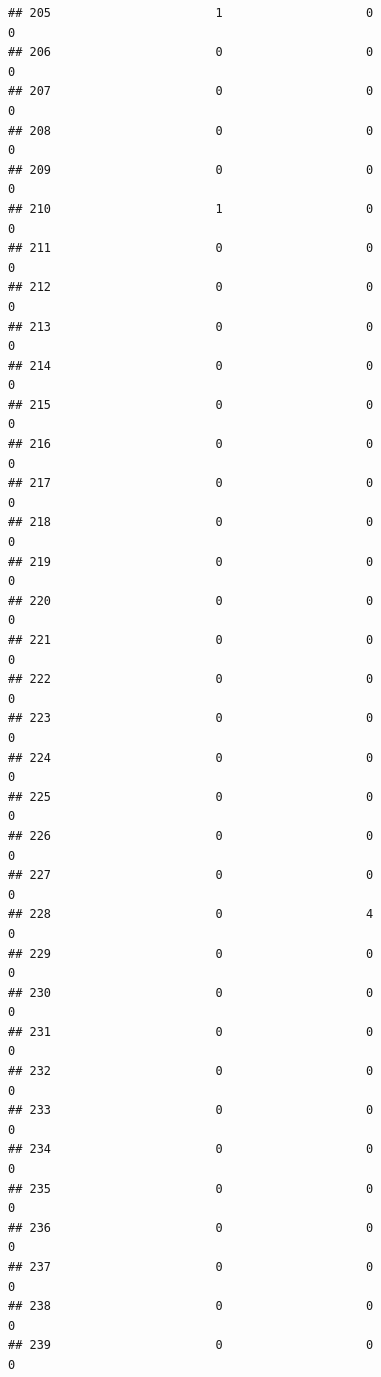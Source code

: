 \documentclass[
]{article}
\begin{document}
\begin{verbatim}
## 205                       1                    0                      0
## 206                       0                    0                      0
## 207                       0                    0                      0
## 208                       0                    0                      0
## 209                       0                    0                      0
## 210                       1                    0                      0
## 211                       0                    0                      0
## 212                       0                    0                      0
## 213                       0                    0                      0
## 214                       0                    0                      0
## 215                       0                    0                      0
## 216                       0                    0                      0
## 217                       0                    0                      0
## 218                       0                    0                      0
## 219                       0                    0                      0
## 220                       0                    0                      0
## 221                       0                    0                      0
## 222                       0                    0                      0
## 223                       0                    0                      0
## 224                       0                    0                      0
## 225                       0                    0                      0
## 226                       0                    0                      0
## 227                       0                    0                      0
## 228                       0                    4                      0
## 229                       0                    0                      0
## 230                       0                    0                      0
## 231                       0                    0                      0
## 232                       0                    0                      0
## 233                       0                    0                      0
## 234                       0                    0                      0
## 235                       0                    0                      0
## 236                       0                    0                      0
## 237                       0                    0                      0
## 238                       0                    0                      0
## 239                       0                    0                      0

\end{verbatim}
\end{document}
